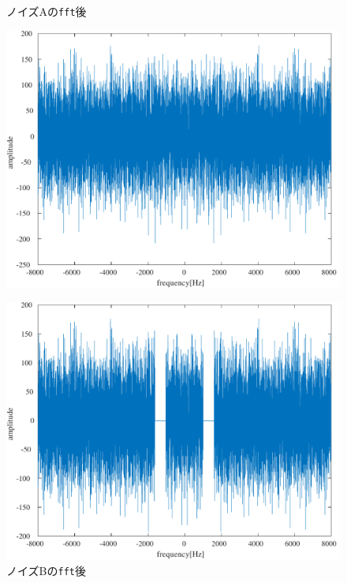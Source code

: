 \begin{figure}[H]
    \centering
    \begin{minipage}{.45\textwidth}
        \centering
        \caption{ノイズAの\texttt{fft}後}
        \label{fig:ノイズAのFFT後}
        \includegraphics[keepaspectratio,width=\textwidth]{../../Figures/04_20_Afft.pdf}
    \end{minipage}
    \hspace{1em}
    \begin{minipage}{.45\textwidth}
        \centering
        \caption{ノイズBの\texttt{fft}後}
        \label{fig:ノイズBのFFT後}
        \includegraphics[keepaspectratio,width=\textwidth]{../../Figures/04_21_Bfft.pdf}
    \end{minipage}
\end{figure}

